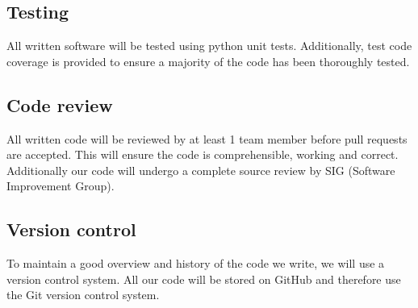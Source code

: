 \subsection{Testing}
All written software will be tested using python unit tests. Additionally, test code coverage is provided to ensure a majority of the code has been thoroughly tested.

\subsection{Code review}
All written code will be reviewed by at least 1 team member before pull requests are accepted. This will ensure the code is comprehensible, working and correct. Additionally our code will undergo a complete source review by SIG (Software Improvement Group).

\subsection{Version control}
To maintain a good overview and history of the code we write, we will use a version control system. All our code will be stored on GitHub and therefore use the Git version control system.

